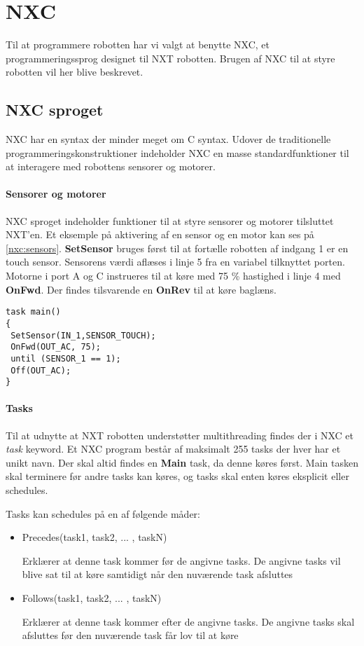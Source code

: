 \section{NXC}
Til at programmere robotten har vi valgt at benytte NXC, et programmeringssprog designet til NXT robotten. 
Brugen af NXC til at styre robotten vil her blive beskrevet. \cite{NXC}

\subsection{NXC sproget}
NXC har en syntax der minder meget om C syntax. 
Udover de traditionelle programmeringskonstruktioner indeholder NXC en masse standardfunktioner til at interagere med robottens sensorer og motorer.

\paragraph{Sensorer og motorer}
NXC sproget indeholder funktioner til at styre sensorer og motorer tilsluttet NXT'en.
Et eksemple på aktivering af en sensor og en motor kan ses på \cref{nxc:sensors}.
\textbf{SetSensor} bruges først til at fortælle robotten af indgang 1 er en touch sensor. 
Sensorens værdi aflæses i linje 5 fra en variabel tilknyttet porten.
Motorne i port A og C instrueres til at køre med 75 \% hastighed i linje 4 med \textbf{OnFwd}.  
Der findes tilsvarende en \textbf{OnRev} til at køre baglæns.

\begin{lstlisting}[style=c,label=nxc:sensors, caption={Brug af motorer og sensorer}]
task main()
{
 SetSensor(IN_1,SENSOR_TOUCH);
 OnFwd(OUT_AC, 75);
 until (SENSOR_1 == 1);
 Off(OUT_AC);
}
\end{lstlisting}

\paragraph{Tasks}
Til at udnytte at NXT robotten understøtter multithreading findes der i NXC et \textit{task} keyword.
Et NXC program består af maksimalt 255 tasks der hver har et unikt navn. 
Der skal altid findes en \textbf{Main} task, da denne køres først.
Main tasken skal terminere før andre tasks kan køres, og tasks skal enten køres eksplicit eller schedules.

Tasks kan schedules på en af følgende måder:

\begin{itemize}
\item Precedes(task1, task2, ... , taskN)

Erklærer at denne task kommer før de angivne tasks. 
De angivne tasks vil blive sat til at køre samtidigt når den nuværende task afsluttes
\item Follows(task1, task2, ... , taskN)

Erklærer at denne task kommer efter de angivne tasks. 
De angivne tasks skal afsluttes før den nuværende task får lov til at køre
\end{itemize}

